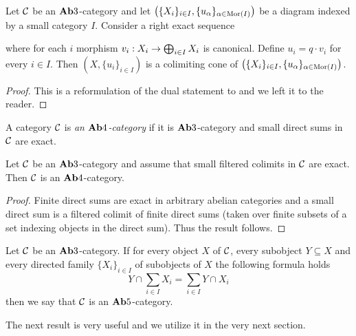 \begin{theorem}\label{theorem:descriptionofcolimitsinab3categories}
Let ${\mathcal C}$ be an $\mathbf{Ab}3$-category and let $\left(\{X_i\}_{i\in I},\{u_{\alpha}\}_{\alpha \in \mathrm{Mor}(I)}\right)$ be a diagram indexed by a small category $I$. Consider a right exact sequence
\begin{center}
\end{center}
where for each $i$ morphism $v_i:X_i \rightarrow \bigoplus_{i\in I}X_i$ is canonical. Define $u_i = q\cdot v_i$ for every $i\in I$. Then $\left(X,\{u_i\}_{i\in I}\right)$ is a colimiting cone of $\left(\{X_i\}_{i\in I},\{u_{\alpha}\}_{\alpha \in \mathrm{Mor}(I)}\right)$.
\end{theorem}
\begin{proof}
This is a reformulation of the dual statement to {\cite[page 113, Theorem 1]{Maclane}} and we left it to the reader.
\end{proof}

\begin{definition}
A category ${\mathcal C}$ is \textit{an $\mathbf{Ab}4$-category} if it is $\mathbf{Ab}3$-category and small direct sums in ${\mathcal C}$ are exact.
\end{definition}

\begin{fact}\label{fact:filteredcolimitsexactisab4}
Let ${\mathcal C}$ be an $\mathbf{Ab}3$-category and assume that small filtered colimits in ${\mathcal C}$ are exact. Then ${\mathcal C}$ is an $\mathbf{Ab}4$-category.
\end{fact}
\begin{proof}
Finite direct sums are exact in arbitrary abelian categories and a small direct sum is a filtered colimit of finite direct sums (taken over finite subsets of a set indexing objects in the direct sum). Thus the result follows.
\end{proof}

\begin{definition}
Let ${\mathcal C}$ be an $\mathbf{Ab}3$-category. If for every object $X$ of ${\mathcal C}$, every subobject $Y\subseteq X$ and every directed family $\big\{X_i\}_{i\in I}$ of subobjects of $X$ the following formula holds
$$Y\cap \sum_{i\in I}X_i = \sum_{i\in I}Y\cap X_i$$
then we say that ${\mathcal C}$ is an $\mathbf{Ab}5$-category.
\end{definition}
\noindent
The next result is very useful and we utilize it in the very next section.

